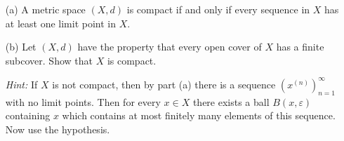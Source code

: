 \begin{problem}[16pts]
  \vphantom{text}
  \begin{enumerate}
  \item[(a)]  A metric space $(X,d)$ is compact if and only if every sequence in $X$ has at least one limit point in $X$.

  
    \item[(b)] 
Let $(X,d)$ have the property that every open cover of $X$ has a finite subcover.  
Show that $X$ is compact.  

\emph{Hint:} If $X$ is not compact, then by part (a) there is a sequence $(x^{(n)})_{n=1}^\infty$ with no limit points.  
Then for every $x \in X$ there exists a ball $B(x,\varepsilon)$ containing $x$ which contains at most finitely many elements of this sequence.  
Now use the hypothesis.
  \end{enumerate}
\end{problem}
